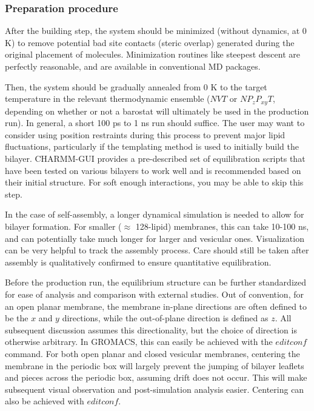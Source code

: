 \documentclass[9pt,bestpractices]{livecoms}
\begin{document}
\subsubsection{Preparation procedure}
\label{subsubsec:prepproc}
After the building step, the system should be minimized (without dynamics, at 0 K) to remove potential bad site contacts (steric overlap) generated during the original placement of molecules.
Minimization routines like steepest descent are perfectly reasonable, and are available in conventional MD packages.

Then, the system should be gradually annealed from 0 K to the target temperature in the relevant thermodynamic ensemble ($NVT$ or $NP_{z}P_{xy}T$, depending on whether or not a barostat will ultimately be used in the production run).
In general, a short 100 ps to 1 ns run should suffice.
The user may want to consider using position restraints during this process to prevent major lipid fluctuations, particularly if the templating method is used to initially build the bilayer. CHARMM-GUI provides a pre-described set of equilibration scripts that have been tested on various bilayers to work well and is recommended based on their initial structure.
For soft enough interactions, you may be able to skip this step.

In the case of self-assembly, a longer dynamical simulation is needed to allow for bilayer formation.
For smaller ($\approx$ 128-lipid) membranes, this can take 10-100 ns, and can potentially take much longer for larger and vesicular ones.
Visualization can be very helpful to track the assembly process.
Care should still be taken after assembly is qualitatively confirmed to ensure quantitative equilibration.

Before the production run, the equilibrium structure can be further standardized for ease of analysis and comparison with external studies.
Out of convention, for an open planar membrane, the membrane in-plane directions are often defined to be the $x$ and $y$ directions, while the out-of-plane direction is defined as $z$.
All subsequent discussion assumes this directionality, but the choice of direction is otherwise arbitrary.
In GROMACS, this can easily be achieved with the $editconf$ command.
For both open planar and closed vesicular membranes, centering the membrane in the periodic box will largely prevent the jumping of bilayer leaflets and pieces across the periodic box, assuming drift does not occur.
This will make subsequent visual observation and post-simulation analysis easier.
Centering can also be achieved with $editconf$.
\end{document}
